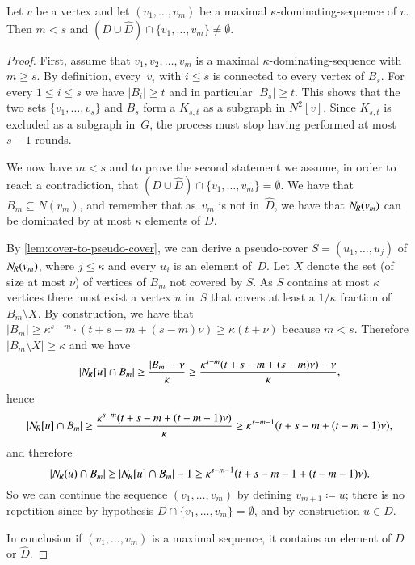 \begin{lemma}\label{lem:max-dom-sequence}
  Let $v$ be a vertex and let
  $(v_1,\ldots, v_m)$ be a maximal $\kappa$-dominating-sequence of $v$. Then $m<s$ and
  $(D\cup\hat{D})\cap \{v_1,\ldots, v_m\}\neq \emptyset$.
\end{lemma}
\begin{proof}
  First, assume that $v_1,v_2,\ldots,v_m$ is a maximal
  $\kappa$-dominating-sequence with $m\ge s$.
  By definition, every~$v_i$ with $i\le s$ is connected to every vertex of $B_s$.
  For every $1\leq i\leq s$ we have $|B_i|\geq t$
  and in particular
  $|B_s|\ge t$. This shows that the two sets
  $\{v_1,\ldots,v_s\}$ and $B_s$ form a $K_{s,t}$ as a subgraph in $N^2[v]$.
  Since $K_{s,t}$ is excluded as a subgraph in~$G$, the process must stop
  having performed at most $s-1$ rounds.

  We now have $m<s$ and to prove the second statement we assume, in order to reach
  a contradiction, that
  $(D\cup\hat{D})\cap\{ v_1,\ldots, v_m\}=\emptyset$.
  We have that $B_m \subseteq N(v_m)$, and remember that as~$v_m$ is not
  in~$\hat{D}$, we have that $N_{\hspace{-1pt}R}(v_m)$ can be
  dominated by at most $\kappa$ elements of $D$.


  By \cref{lem:cover-to-pseudo-cover},
  we can derive a pseudo-cover $S=(u_1,\ldots,u_j)$ of
  $N_{\hspace{-1pt}R}(v_m)$, where $j\le \kappa$ and every $u_i$ is an element of~$D$.
  Let $X$ denote the set (of size at most $\nu$) of vertices of $B_m$ not covered by $S$.
  As $S$ contains at most $\kappa$ vertices there must exist a
  vertex $u$ in~$S$ that covers at least a $1/\kappa$ fraction of
  $B_m\setminus X$.
  By construction, we have that $|B_m| \ge \kappa^{s-m}\cdot(t+s-m+(s-m)\nu)\ge \kappa(t+\nu)$
  because $m<s$. Therefore $|B_m\setminus X| \ge \kappa$ and we have
  $$|N_{\hspace{-1pt}R}[u]\cap B_{m}|\geq \frac{|B_m|-\nu}{\kappa}
  \geq\frac{\kappa^{s-m}(t+s-m+(s-m)\nu) -\nu}{\kappa},$$
  hence
  $$|N_{\hspace{-1pt}R}[u]\cap B_{m}| \geq\frac{\kappa^{s-m}(t+s-m+(t-m-1)\nu)}{\kappa} \geq
  \kappa^{s-m-1}(t+s-m+(t-m-1)\nu),$$
  and therefore
  $$ |N_{\hspace{-1pt}R}(u)\cap B_{m}| \geq |N_{\hspace{-1pt}R}[u]\cap B_{m}|-1 \geq \kappa^{s-m-1}(t+s-m-1+(t-m-1)\nu).$$
  So we can continue the sequence $(v_1,\ldots,v_m)$ by defining
  $v_{m+1}\coloneqq u$; there is no repetition since by hypothesis
  $D\cap\{ v_1,\ldots, v_m\}=\emptyset$, and by construction
  $u\in D$.

  In conclusion if $(v_1,\ldots,v_m)$ is a maximal
  sequence, it contains an element of $D$ or $\hat{D}$.
\end{proof}

